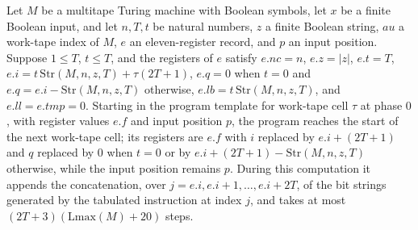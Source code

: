 \begin{theorem}
\label{Complexity.UTab.goes_cells}
\leanok
{}
Let $M$ be a multitape Turing machine with Boolean symbols, let $x$ be a finite Boolean
input, and let $n,T,t$ be natural numbers, $z$ a finite Boolean string, $	au$ a
work-tape index of $M$, $e$ an eleven-register record, and $p$ an input position.
Suppose $1 \le T$, $t \le T$, and the registers of $e$ satisfy $e.nc=n$, $e.z=|z|$,
$e.t=T$, $e.i=t\,\mathrm{Str}(M,n,z,T)+\tau(2T+1)$, $e.q=0$ when $t=0$ and
$e.q=e.i-\mathrm{Str}(M,n,z,T)$ otherwise, $e.lb=t\,\mathrm{Str}(M,n,z,T)$, and
$e.ll=e.tmp=0$. Starting in the program template for work-tape cell $\tau$ at phase $0$,
with register values $e.f$ and input position $p$, the program reaches the start of the
next work-tape cell; its registers are $e.f$ with $i$ replaced by $e.i+(2T+1)$ and $q$
replaced by $0$ when $t=0$ or by $e.i+(2T+1)-\mathrm{Str}(M,n,z,T)$ otherwise, while the
input position remains $p$. During this computation it appends the concatenation, over
$j=e.i,e.i+1,\ldots,e.i+2T$, of the bit strings generated by the tabulated instruction
at index $j$, and takes at most $(2T+3)(\mathrm{Lmax}(M)+20)$ steps.
\end{theorem}

